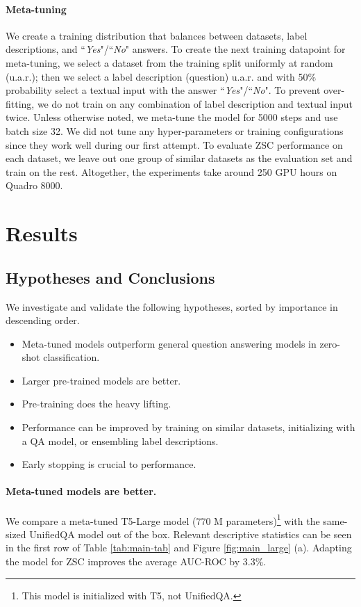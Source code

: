 \paragraph{Meta-tuning}
We create a training distribution that balances between datasets, label descriptions, and ``\textit{Yes}"/``\textit{No}" answers. To create the next training datapoint for meta-tuning, we select a dataset from the training split uniformly at random (u.a.r.); then we select a label description (question) u.a.r. and with 50\% probability select a textual input with the answer ``\textit{Yes}"/``\textit{No}".
To prevent over-fitting, we do not train on any combination of label description and textual input twice. Unless otherwise noted, we meta-tune the model for 5000 steps and use batch size 32. We did not tune any hyper-parameters or training configurations since they work well during our first attempt. To evaluate ZSC performance on each dataset, we leave out one group of similar datasets as the evaluation set and train on the rest. Altogether, the experiments take around 250 GPU hours on Quadro 8000. 

\section{Results} \label{sec:results}

\subsection{Hypotheses and Conclusions} \label{sec:core-results}

We investigate and validate the following hypotheses, sorted by importance in descending order.

\begin{itemize}
    \item Meta-tuned models outperform general question answering models in zero-shot classification.
    \item Larger pre-trained models are better.
    \item Pre-training does the heavy lifting.
    \item Performance can be improved by training on similar datasets, initializing with a QA model, or ensembling label descriptions.
    \item Early stopping is crucial to performance.
\end{itemize}

\paragraph{Meta-tuned models are better.} We compare a meta-tuned T5-Large model (770 M parameters)\footnote{This model is initialized with T5, not UnifiedQA.} with the same-sized UnifiedQA model \cite{khashabi-etal-2020-unifiedqa} out of the box. Relevant descriptive statistics can be seen in the first row of Table \ref{tab:main-tab} and Figure \ref{fig:main_large} (a). Adapting the model for ZSC improves the average AUC-ROC by 3.3\%. 
